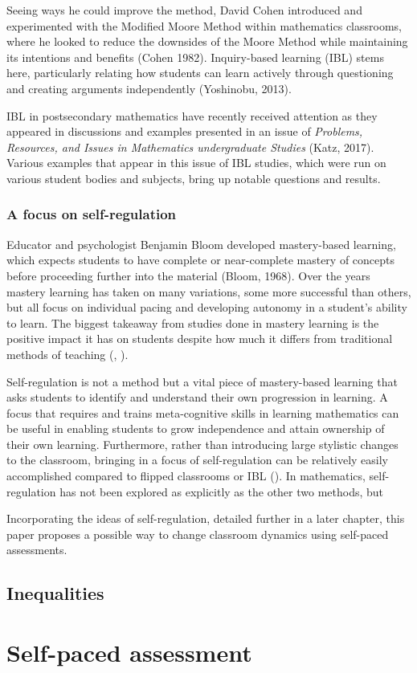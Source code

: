 Seeing ways he could improve the method, David Cohen introduced and experimented with the Modified Moore Method within mathematics classrooms, where he looked to reduce the downsides of the Moore Method while maintaining its intentions and benefits (Cohen 1982). Inquiry-based learning (IBL) stems here, particularly relating how students can learn actively through questioning and creating arguments independently (Yoshinobu, 2013).

IBL in postsecondary mathematics have recently received attention as they appeared in discussions and examples presented in an issue of {\it Problems, Resources, and Issues in Mathematics undergraduate Studies} (Katz, 2017). Various examples that appear in this issue of IBL studies, which were run on various student bodies and subjects, bring up notable questions and results.

\subsubsection{A focus on self-regulation}
Educator and psychologist Benjamin Bloom developed mastery-based learning, which expects students to have complete or near-complete mastery of concepts before proceeding further into the material (Bloom, 1968). Over the years mastery learning has taken on many variations, some more successful than others, but all focus on individual pacing and developing autonomy in a student's ability to learn. The biggest takeaway from studies done in mastery learning is the positive impact it has on students despite how much it differs from traditional methods of teaching (\cite{zollinger_impact_2017}, \cite{bradley_evaluating_2017}).

Self-regulation is not a method but a vital piece of mastery-based learning that asks students to identify and understand their own progression in learning. A focus that requires and trains meta-cognitive skills in learning mathematics can be useful in enabling students to grow independence and attain ownership of their own learning. Furthermore, rather than introducing large stylistic changes to the classroom, bringing in a focus of self-regulation can be relatively easily accomplished compared to flipped classrooms or IBL (\cite{montague_self-regulation_2007}). In mathematics, self-regulation has not been explored as explicitly as the other two methods, but 

Incorporating the ideas of self-regulation, detailed further in a later chapter, this paper proposes a possible way to change classroom dynamics using self-paced assessments.

\subsection{Inequalities}
\section{Self-paced assessment}
